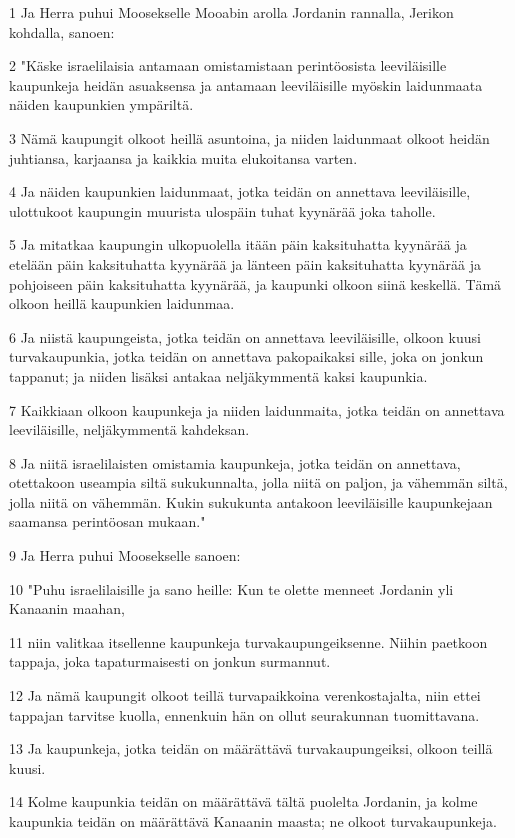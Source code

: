 \par 1 Ja Herra puhui Moosekselle Mooabin arolla Jordanin rannalla, Jerikon kohdalla, sanoen:
\par 2 "Käske israelilaisia antamaan omistamistaan perintöosista leeviläisille kaupunkeja heidän asuaksensa ja antamaan leeviläisille myöskin laidunmaata näiden kaupunkien ympäriltä.
\par 3 Nämä kaupungit olkoot heillä asuntoina, ja niiden laidunmaat olkoot heidän juhtiansa, karjaansa ja kaikkia muita elukoitansa varten.
\par 4 Ja näiden kaupunkien laidunmaat, jotka teidän on annettava leeviläisille, ulottukoot kaupungin muurista ulospäin tuhat kyynärää joka taholle.
\par 5 Ja mitatkaa kaupungin ulkopuolella itään päin kaksituhatta kyynärää ja etelään päin kaksituhatta kyynärää ja länteen päin kaksituhatta kyynärää ja pohjoiseen päin kaksituhatta kyynärää, ja kaupunki olkoon siinä keskellä. Tämä olkoon heillä kaupunkien laidunmaa.
\par 6 Ja niistä kaupungeista, jotka teidän on annettava leeviläisille, olkoon kuusi turvakaupunkia, jotka teidän on annettava pakopaikaksi sille, joka on jonkun tappanut; ja niiden lisäksi antakaa neljäkymmentä kaksi kaupunkia.
\par 7 Kaikkiaan olkoon kaupunkeja ja niiden laidunmaita, jotka teidän on annettava leeviläisille, neljäkymmentä kahdeksan.
\par 8 Ja niitä israelilaisten omistamia kaupunkeja, jotka teidän on annettava, otettakoon useampia siltä sukukunnalta, jolla niitä on paljon, ja vähemmän siltä, jolla niitä on vähemmän. Kukin sukukunta antakoon leeviläisille kaupunkejaan saamansa perintöosan mukaan."
\par 9 Ja Herra puhui Moosekselle sanoen:
\par 10 "Puhu israelilaisille ja sano heille: Kun te olette menneet Jordanin yli Kanaanin maahan,
\par 11 niin valitkaa itsellenne kaupunkeja turvakaupungeiksenne. Niihin paetkoon tappaja, joka tapaturmaisesti on jonkun surmannut.
\par 12 Ja nämä kaupungit olkoot teillä turvapaikkoina verenkostajalta, niin ettei tappajan tarvitse kuolla, ennenkuin hän on ollut seurakunnan tuomittavana.
\par 13 Ja kaupunkeja, jotka teidän on määrättävä turvakaupungeiksi, olkoon teillä kuusi.
\par 14 Kolme kaupunkia teidän on määrättävä tältä puolelta Jordanin, ja kolme kaupunkia teidän on määrättävä Kanaanin maasta; ne olkoot turvakaupunkeja.
